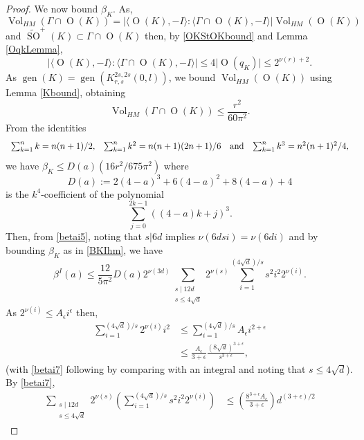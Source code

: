 \documentclass[12pt, a4paper]{article}
\newcommand{\la}{\langle}
\newcommand{\ra}{\rangle}
\newcommand{\opn}{\operatorname}
\begin{document}
\begin{proof}
    We now bound $\beta_K$. 
    As,
    \[
    \opn{Vol}_{HM}(\Gamma \cap \opn{O}(K))
    =
    \vert \la \opn{O}(K), -I \ra : \la \Gamma \cap \opn{O}(K), -I \ra \vert
    \opn{Vol}_{HM}(\opn{O}(K))
    \]
    and $\widetilde{\opn{SO}}^+(K) \subset \Gamma \cap \opn{O}(K)$
    then, by \eqref{OKStOKbound} and Lemma \ref{OqkLemma}, 
\[
    \vert \la \opn{O}(K), -I \ra :  \la \Gamma \cap \opn{O}(K), -I \ra \vert
    \leq
    4 \vert \opn{O}(q_K) \vert 
    \leq
    2^{\nu(r)+2}. 
\]
As $\opn{gen}(K)  = \opn{gen}(K^{2s, 2s}_{r,s}(0,l))$, we bound $\opn{Vol}_{HM}(\opn{O}(K))$ using Lemma \ref{Kbound}, obtaining
  \begin{equation}\label{BKIhm}
    \opn{Vol}_{HM}(\Gamma \cap \opn{O}(K)) \leq \frac{r^2}{60 \pi^2}.
  \end{equation}
  From the identities
  \[
  \begin{array}{c c c c}
    \sum_{k=1}^n k = n(n+1)/2, & \sum_{k=1}^n k^2 = n(n+1)(2n+1)/6 & \text{and}  & \sum_{k=1}^n k^3 = n^2(n+1)^2 / 4, 
  \end{array}
  \]
  we have
  $\beta_K \leq D(a) (16r^2/675 \pi^2)$   
  where
\[
  D(a) := 
    2(4-a)^3 +
    6(4-a)^2 +
    8(4-a) +
    4
    \]
is the $k^4$-coefficient of the polynomial
  \[
  \sum_{j=0}^{2k-1} ((4-a)k+j)^3.
  \]
  Then, from \eqref{betai5}, noting that $s \vert 6 d$ implies $\nu(6dsi) = \nu(6di)$ and by bounding $\beta_K$ as in \eqref{BKIhm}, we have 
\[
  \beta^I(a)
    \leq
    \frac{12}{5 \pi^2} D(a) 2^{\nu(3d)} 
    \sum_{\substack{s \mid 12d \\ s \leq 4 \sqrt{d}}} 2^{\nu(s)}
    \sum_{i=1}^{(4 \sqrt{d})/s}  s^2 i^2 2^{\nu(i)}.  
\]
As $2^{\nu(i)} \leq A_{\epsilon} i^{\epsilon}$ then, 
  \begin{align}
    \sum_{i=1}^{(4\sqrt{d})/s} 2^{\nu(i)} i^2
    & \leq
    \sum_{i=1}^{(4 \sqrt{d})/s} A_{\epsilon} i^{2 + \epsilon} \nonumber \\
& \leq
    \frac{A_{\epsilon}}{3+\epsilon} \frac{(8 \sqrt{d})^{3 + \epsilon}}{s^{3 + \epsilon}}, \label{betai7}
\end{align}
  (with \eqref{betai7} following by comparing with an integral and noting that $s \leq 4 \sqrt{d}$). 
  By \eqref{betai7},
  \begin{align*}
    \sum_{\substack{s \mid 12 d \\ s \leq 4 \sqrt{d}}}
    2^{ \nu(s)} 
    \left (
    \sum_{i=1}^{(4 \sqrt{d})/s} s^2 i^2 2^{\nu(i)}
    \right )
    & \leq
    \left (
    \frac{8^{3 + \epsilon} A_{\epsilon}}{3 + \epsilon}
    \right )
    d^{(3+\epsilon)/2}

\end{align*}
\end{proof}
\end{document}

